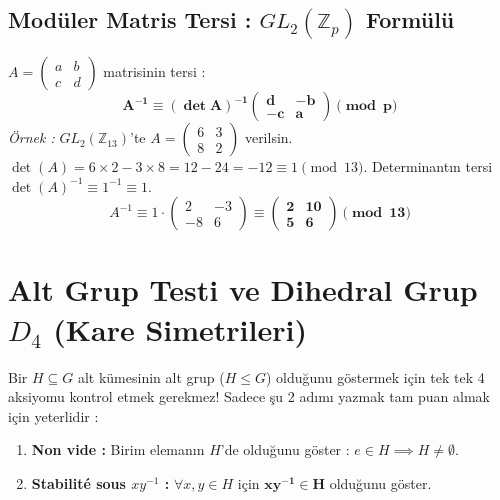 \documentclass[11pt,a4paper]{article}
\begin{document}
\subsection*{Modüler Matris Tersi : $GL_2(\mathbb{Z}_p)$ Formülü}
$A = \begin{pmatrix} a & b \\ c & d \end{pmatrix}$ matrisinin tersi :
\[ \mathbf{A^{-1} \equiv (\det A)^{-1} \begin{pmatrix} d & -b \\ -c & a \end{pmatrix} \pmod p} \]
\textit{Örnek :} $GL_2(\mathbb{Z}_{13})$'te $A = \begin{pmatrix} 6 & 3 \\ 8 & 2 \end{pmatrix}$ verilsin.  
$\det(A) = 6 \times 2 - 3 \times 8 = 12 - 24 = -12 \equiv 1 \pmod{13}$.  
Determinantın tersi $\det(A)^{-1} \equiv 1^{-1} \equiv 1$.  
\[ A^{-1} \equiv 1 \cdot \begin{pmatrix} 2 & -3 \\ -8 & 6 \end{pmatrix} \equiv \mathbf{\begin{pmatrix} 2 & 10 \\ 5 & 6 \end{pmatrix} \pmod{13}} \]

\vspace{0.5cm}

\section{Alt Grup Testi ve Dihedral Grup $D_4$ (Kare Simetrileri)}

\begin{tcolorbox}[colback=teal!5!white,colframe=teal!80!black,title=Alt Grup Testi (Test en 1 étape)]
Bir $H \subseteq G$ alt kümesinin alt grup ($H \leq G$) olduğunu göstermek için tek tek 4 aksiyomu kontrol etmek gerekmez! Sadece şu 2 adımı yazmak tam puan almak için yeterlidir :
\begin{enumerate}
    \item \textbf{Non vide :} Birim elemanın $H$'de olduğunu göster : $e \in H \implies H \neq \emptyset$.
    \item \textbf{Stabilité sous $xy^{-1}$ :} $\forall x, y \in H$ için $\mathbf{x y^{-1} \in H}$ olduğunu göster.
\end{enumerate}
\end{tcolorbox}
\end{document}
